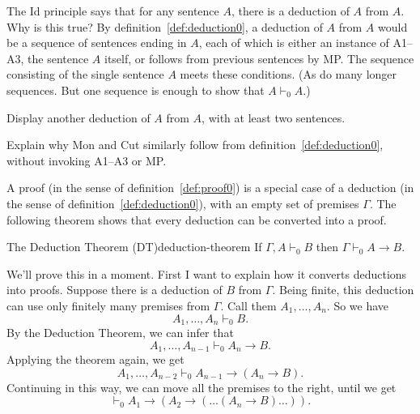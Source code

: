 The Id principle says that
for any sentence $A$,
there is a deduction of $A$ from $A$.
Why is this true?
By definition~\ref{def:deduction0},
a deduction of $A$ from $A$ would be a sequence of sentences ending in $A$,
each of which is either an instance of A1--A3, the sentence $A$ itself, or follows from previous sentences by MP.
The sequence consisting of the single sentence $A$ meets these conditions.
(As do many longer sequences.
But one sequence is enough to show that $A \vdash_0 A$.)

\begin{exercise}
  Display another deduction of $A$ from $A$, with at least two sentences.
\end{exercise}
\begin{exercise}
  Explain why Mon and Cut similarly follow from definition~\ref{def:deduction0},
  without invoking A1--A3 or MP.
\end{exercise}




A proof (in the sense of definition~\ref{def:proof0}) is
a special case of a deduction (in the sense of definition~\ref{def:deduction0}),
with an empty set of premises $\Gamma$.
The following theorem
shows that every deduction can be converted into a proof.

\begin{theorem}{The Deduction Theorem (DT)}{deduction-theorem}
  If $\Gamma,A \vdash_{0} B$ then $\Gamma \vdash_{0} A \to B$.
\end{theorem}

We'll prove this in a moment.
First I want to explain how it converts deductions into proofs.
Suppose there is a deduction of $B$ from $\Gamma$.
Being finite,
this deduction can use only finitely many premises from $\Gamma$.
Call them $A_{1},\ldots,A_{n}$.
So we have
\[
  A_{1},\ldots,A_{n} \vdash_{0} B.
\]
By the Deduction Theorem,
we can infer that
\[
  A_{1},\ldots,A_{n-1} \vdash_{0} A_{n} \to B.
\]
Applying the theorem again,
we get
\[
  A_{1},\ldots,A_{n-2} \vdash_{0} A_{n-1} \to (A_{n} \to B).
\]
Continuing in this way,
we can move all the premises to the right,
until we get
\[
  \vdash_{0} A_{1} \to (A_{2} \to (\ldots (A_{n} \to B)\ldots)).
\]

